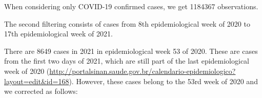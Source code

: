 \documentclass[
]{article}
\newenvironment{Shaded}{\begin{snugshade}}{\end{snugshade}}
\newcommand{\CommentTok}[1]{\textcolor[rgb]{0.56,0.35,0.01}{\textit{#1}}}
\newcommand{\DataTypeTok}[1]{\textcolor[rgb]{0.13,0.29,0.53}{#1}}
\newcommand{\DecValTok}[1]{\textcolor[rgb]{0.00,0.00,0.81}{#1}}
\newcommand{\KeywordTok}[1]{\textcolor[rgb]{0.13,0.29,0.53}{\textbf{#1}}}
\newcommand{\NormalTok}[1]{#1}
\newcommand{\OperatorTok}[1]{\textcolor[rgb]{0.81,0.36,0.00}{\textbf{#1}}}
\newcommand{\StringTok}[1]{\textcolor[rgb]{0.31,0.60,0.02}{#1}}
\begin{document}
When considering only COVID-19 confirmed cases, we get 1184367
observations.

The second filtering consists of cases from 8th epidemiological week of
2020 to 17th epidemiological week of 2021.

\begin{Shaded}
\end{Shaded}

There are 8649 cases in 2021 in epidemiological week 53 of 2020. These
are cases from the first two days of 2021, which are still part of the
last epidemiological week of 2020
(\url{http://portalsinan.saude.gov.br/calendario-epidemiologico?layout=edit\&id=168}).
However, these cases belong to the 53rd week of 2020 and we corrected as
follows:

\begin{Shaded}
\end{Shaded}
\end{document}
